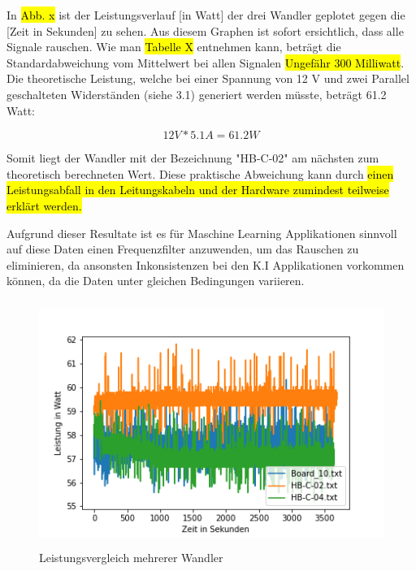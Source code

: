 \begin{flushleft}

In \hl{Abb. x} ist der Leistungsverlauf [in Watt] der drei Wandler geplotet gegen die [Zeit in Sekunden] zu sehen. Aus diesem Graphen ist sofort ersichtlich, dass alle Signale rauschen. Wie man \hl{Tabelle X} entnehmen kann, beträgt die Standardabweichung vom Mittelwert bei allen Signalen \hl{Ungefähr 300 Milliwatt}. Die theoretische Leistung, welche bei einer Spannung von 12 V und zwei Parallel geschalteten Widerständen (siehe 3.1) generiert werden müsste, beträgt 61.2 Watt: 

\begin{equation}[H]
\label{Ohmsches Gesetz}
12 V * 5.1 A = 61.2 W 
\end{equation} 

Somit liegt der Wandler mit der Bezeichnung "HB-C-02" am nächsten zum theoretisch berechneten Wert. Diese praktische Abweichung kann durch \hl{einen Leistungsabfall in den Leitungskabeln und der Hardware zumindest teilweise erklärt werden.}

Aufgrund dieser Resultate ist es für Maschine Learning Applikationen sinnvoll auf diese Daten einen Frequenzfilter anzuwenden, um das Rauschen zu eliminieren, da ansonsten Inkonsistenzen bei den K.I Applikationen vorkommen können, da die Daten unter gleichen Bedingungen variieren. 

\end{flushleft}

\begin{figure}[H]
    \centering
    \includegraphics[height= 8cm, width = \textwidth]{Pictures/3_Boards_Leistung.png}
    \caption{Leistungsvergleich mehrerer Wandler}
\end{figure}



